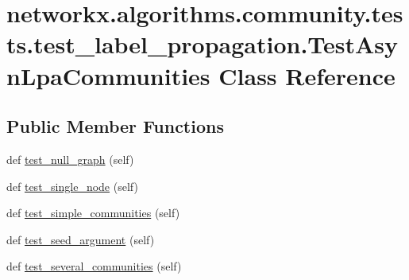 \hypertarget{classnetworkx_1_1algorithms_1_1community_1_1tests_1_1test__label__propagation_1_1TestAsynLpaCommunities}{}\section{networkx.\+algorithms.\+community.\+tests.\+test\+\_\+label\+\_\+propagation.\+Test\+Asyn\+Lpa\+Communities Class Reference}
\label{classnetworkx_1_1algorithms_1_1community_1_1tests_1_1test__label__propagation_1_1TestAsynLpaCommunities}
\subsection*{Public Member Functions}
\begin{DoxyCompactItemize}
\item 
def \hyperlink{classnetworkx_1_1algorithms_1_1community_1_1tests_1_1test__label__propagation_1_1TestAsynLpaCommunities_a018a7542b1dd0a14ff278087605f123e}{test\+\_\+null\+\_\+graph} (self)
\item 
def \hyperlink{classnetworkx_1_1algorithms_1_1community_1_1tests_1_1test__label__propagation_1_1TestAsynLpaCommunities_a1320775702d837dd5cfb8098ade78cf8}{test\+\_\+single\+\_\+node} (self)
\item 
def \hyperlink{classnetworkx_1_1algorithms_1_1community_1_1tests_1_1test__label__propagation_1_1TestAsynLpaCommunities_a0f4ab27ccd5eb0e6d77174dfa8df3050}{test\+\_\+simple\+\_\+communities} (self)
\item 
def \hyperlink{classnetworkx_1_1algorithms_1_1community_1_1tests_1_1test__label__propagation_1_1TestAsynLpaCommunities_aa020df435e99270e53df201ce5b00623}{test\+\_\+seed\+\_\+argument} (self)
\item 
def \hyperlink{classnetworkx_1_1algorithms_1_1community_1_1tests_1_1test__label__propagation_1_1TestAsynLpaCommunities_a4a8cef7487264352c24e21838929fd7e}{test\+\_\+several\+\_\+communities} (self)
\end{DoxyCompactItemize}


